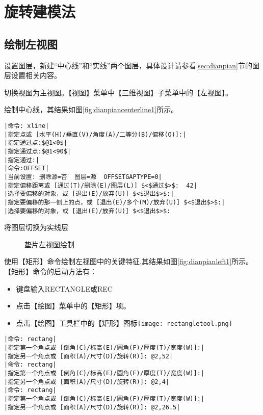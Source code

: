\section{旋转建模法}
\subsection{绘制左视图}
\begin{procedure}
\item 设置图层，新建“中心线”和“实线”两个图层，具体设计请参看\ref{sec:dianpian}节的图层设置相关内容。
\item  切换视图为主视图。【视图】菜单中【三维视图】子菜单中的【左视图】。
\item 绘制中心线，其结果如图\ref{fig:dianpiancenterline1}所示。
\begin{lstlisting}
|命令: xline|
|指定点或 [水平(H)/垂直(V)/角度(A)/二等分(B)/偏移(O)]:|
|指定通过点:$@1<0$|
|指定通过点:$@1<90$|
|指定通过:|
|命令:OFFSET|
|当前设置: 删除源=否  图层=源  OFFSETGAPTYPE=0|
|指定偏移距离或 [通过(T)/删除(E)/图层(L)] $<$通过$>$:  42|
|选择要偏移的对象，或 [退出(E)/放弃(U)] $<$退出$>$:|
|指定要偏移的那一侧上的点，或 [退出(E)/多个(M)/放弃(U)] $<$退出$>$:|
|选择要偏移的对象，或 [退出(E)/放弃(U)] $<$退出$>$:
\end{lstlisting}
\item 将图层切换为实线层
\begin{figure}[htbp]
\centering
{}\hspace{40pt}
\caption{垫片左视图绘制}
\end{figure}
\item 使用【矩形】命令绘制左视图中的关键特征,其结果如图\ref{fig:dianpianleft1}所示。【矩形】命令的启动方法有：
\begin{itemize}
\item 键盘输入RECTANGLE或REC
\item 点击【绘图】菜单中的【矩形】项。
\item 点击【绘图】工具栏中的【矩形】图标\texttt{[image: rectangletool.png]}
\end{itemize}
\begin{lstlisting}
|命令: rectang|
|指定第一个角点或 [倒角(C)/标高(E)/圆角(F)/厚度(T)/宽度(W)]:|
|指定另一个角点或 [面积(A)/尺寸(D)/旋转(R)]: @2,52|
|命令: rectang|
|指定第一个角点或 [倒角(C)/标高(E)/圆角(F)/厚度(T)/宽度(W)]:|
|指定另一个角点或 [面积(A)/尺寸(D)/旋转(R)]: @2,4|
|命令: rectang|
|指定第一个角点或 [倒角(C)/标高(E)/圆角(F)/厚度(T)/宽度(W)]:|
|指定另一个角点或 [面积(A)/尺寸(D)/旋转(R)]: @2,26.5|
\end{lstlisting}
\end{procedure}

